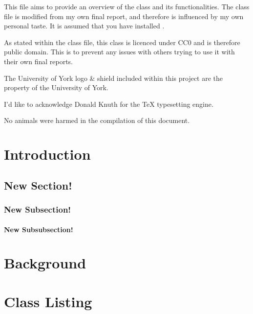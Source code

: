 \documentclass[12pt, twoside]{pet-final-report}
\author{Jacqueline Walker}
\begin{document}
\maketitle

\begin{frabstract}
        This file aims to provide an overview of the 
        class and its functionalities. The class file is modified from my own
        final report, and therefore is influenced by my own personal taste.
        It is assumed that you have installed .

        As stated within the class file, this class is licenced under CC0
        and is therefore public domain. This is to prevent any issues with
        others trying to use it with their own final reports.

        The University of York logo \& shield included within this project are
        the property of the University of York.
\end{frabstract}

\begin{fracknowledgements}
        I'd like to acknowledge Donald Knuth for the TeX typesetting engine.
\end{fracknowledgements}

\begin{frethics}
        No animals were harmed in the compilation of this document.
\end{frethics}

\newpage
\tableofcontents
\newpage 

\chapter{Introduction}
\blindtext[12]
\section{New Section!}
\blindtext[6]
\subsection{New Subsection!}
\blindtext[6]
\subsubsection{New Subsubsection!}
\blindtext[6]

\chapter{Background}
\chapter{Class Listing}
\end{document}

